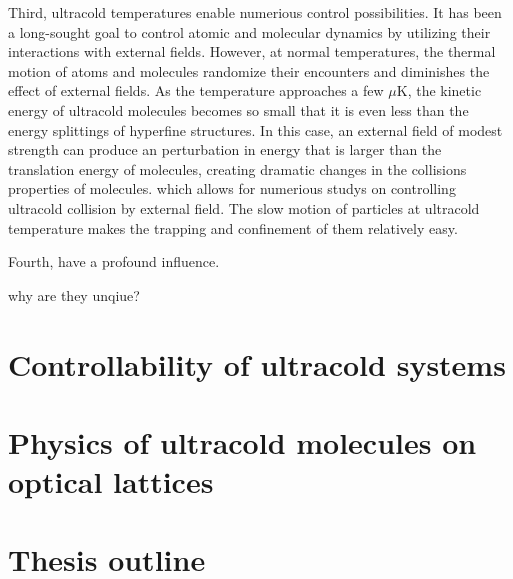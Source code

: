 Third, ultracold temperatures enable numerious control possibilities. It has been a long-sought goal to control atomic and 
molecular dynamics by utilizing their interactions with external fields. However, at normal temperatures, the thermal 
motion of atoms and molecules randomize their encounters and diminishes the effect of external fields. As the temperature
approaches a few $\mu$K, the kinetic energy of ultracold molecules becomes so small  that it is even less than 
the energy splittings of hyperfine structures. In this case, an external field of modest strength can produce an perturbation
in energy that is larger than the translation energy of molecules, creating dramatic changes in the collisions properties of
molecules. which allows for numerious studys on controlling ultracold collision by external field\cite{krems2005}. The 
slow motion of particles at ultracold temperature makes the trapping and confinement of them relatively easy. 

Fourth, 
 have a profound influence. 

why are they unqiue?

%



\section{Controllability of ultracold systems}
\label{sec:control}


\section{Physics of ultracold molecules on optical lattices}
\label{sec:opticalLattice}

\section{Thesis outline}
\label{sec:outline}

